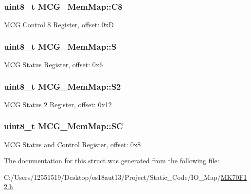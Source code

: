 \subsubsection[{C8}]{\setlength{\rightskip}{0pt plus 5cm}uint8\+\_\+t M\+C\+G\+\_\+\+Mem\+Map\+::\+C8}\label{struct_m_c_g___mem_map_a346a8b8c5c2c675e6297aaa1f14798df}
M\+C\+G Control 8 Register, offset\+: 0x\+D \hypertarget{struct_m_c_g___mem_map_a65ee0333e0d5c462c7dd8c2402bf93be}{}
\subsubsection[{S}]{\setlength{\rightskip}{0pt plus 5cm}uint8\+\_\+t M\+C\+G\+\_\+\+Mem\+Map\+::\+S}\label{struct_m_c_g___mem_map_a65ee0333e0d5c462c7dd8c2402bf93be}
M\+C\+G Status Register, offset\+: 0x6 \hypertarget{struct_m_c_g___mem_map_a97d548f46a8b3fa3cd094dbbd5e579af}{}
\subsubsection[{S2}]{\setlength{\rightskip}{0pt plus 5cm}uint8\+\_\+t M\+C\+G\+\_\+\+Mem\+Map\+::\+S2}\label{struct_m_c_g___mem_map_a97d548f46a8b3fa3cd094dbbd5e579af}
M\+C\+G Status 2 Register, offset\+: 0x12 \hypertarget{struct_m_c_g___mem_map_aeff584aa52340d7c66dc06789ad05310}{}
\subsubsection[{S\+C}]{\setlength{\rightskip}{0pt plus 5cm}uint8\+\_\+t M\+C\+G\+\_\+\+Mem\+Map\+::\+S\+C}\label{struct_m_c_g___mem_map_aeff584aa52340d7c66dc06789ad05310}
M\+C\+G Status and Control Register, offset\+: 0x8 

The documentation for this struct was generated from the following file\+:\begin{DoxyCompactItemize}
\item 
C\+:/\+Users/12551519/\+Desktop/es18aut13/\+Project/\+Static\+\_\+\+Code/\+I\+O\+\_\+\+Map/\hyperlink{_m_k70_f12_8h}{M\+K70\+F12.\+h}\end{DoxyCompactItemize}
